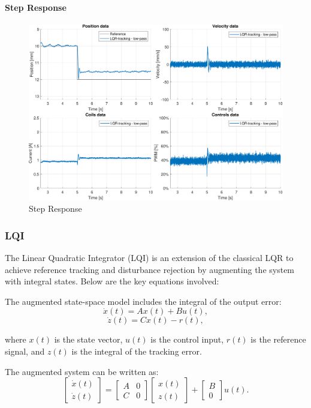 \paragraph{Step Response}

\begin{figure}[H]
    \centering
    \includegraphics[width=0.8\linewidth]{./img/MATLAB/results/step_LQR_tracking_star.pdf}
    \caption{Step Response}
    \label{fig:Step Response}
\end{figure}



\subsubsection{LQI}
\label{subsubsec:lqi}
The Linear Quadratic Integrator (LQI) is an extension of the classical LQR to achieve reference tracking and disturbance rejection by augmenting the system with integral states. Below are the key equations involved:

The augmented state-space model includes the integral of the output error:
\[
    \dot{x}(t) = A x(t) + B u(t),
\]
\[
    \dot{z}(t) = C x(t) - r(t),
\]

where $x(t)$ is the state vector, $u(t)$ is the control input, $r(t)$ is the reference signal, and $z(t)$ is the integral of the tracking error.

The augmented system can be written as:
\begin{equation}
    \begin{bmatrix}
        \dot{x}(t) \\
        \dot{z}(t)
    \end{bmatrix}
    =
    \begin{bmatrix}
        A & 0 \\
        C & 0
    \end{bmatrix}
    \begin{bmatrix}
        x(t) \\
        z(t)
    \end{bmatrix}
    +
    \begin{bmatrix}
        B \\
        0
    \end{bmatrix}
    u(t).
\end{equation}

